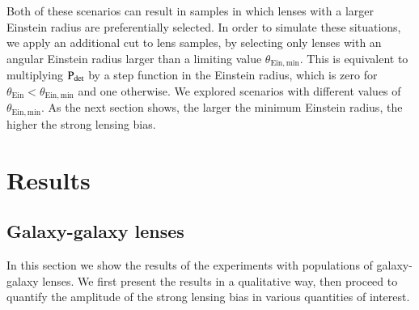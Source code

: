 \documentclass{aa}
\def\tein{\theta_{\mathrm{Ein}}}
\def\pdet{{\rm P}_\mathrm{det}}
\begin{document}
Both of these scenarios can result in samples in which lenses with a larger Einstein radius are preferentially selected.
In order to simulate these situations, we apply an additional cut to lens samples, by selecting only lenses with an angular Einstein radius larger than a limiting value $\theta_{\mathrm{Ein,min}}$.
This is equivalent to multiplying $\pdet$ by a step function in the Einstein radius, which is zero for $\tein < \theta_{\mathrm{Ein,min}}$ and one otherwise.
We explored scenarios with different values of $\theta_{\mathrm{Ein,min}}$.
As the next section shows, the larger the minimum Einstein radius, the higher the strong lensing bias.


\section{Results}\label{sect:results}


\subsection{Galaxy-galaxy lenses}

In this section we show the results of the experiments with populations of galaxy-galaxy lenses.
We first present the results in a qualitative way, then proceed to quantify the amplitude of the strong lensing bias in various quantities of interest.
\end{document}
